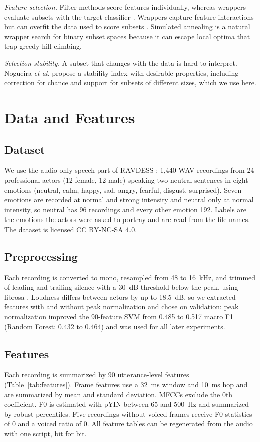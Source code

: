 \documentclass[conference]{IEEEtran}
\begin{document}
\emph{Feature selection.} Filter methods score features individually, whereas wrappers evaluate
subsets with the target classifier \cite{guyon2003featsel}. Wrappers capture feature
interactions but can overfit the data used to score subsets \cite{kohavi1997wrappers}. Simulated
annealing \cite{kirkpatrick1983sa} is a natural wrapper search for binary subset spaces because
it can escape local optima that trap greedy hill climbing.

\emph{Selection stability.} A subset that changes with the data is hard to interpret. Nogueira
\emph{et al.} \cite{nogueira2018stability} propose a stability index with desirable properties,
including correction for chance and support for subsets of different sizes, which we use here.

\section{Data and Features}

\subsection{Dataset}
We use the audio-only speech part of RAVDESS \cite{livingstone2018ravdess}: 1{,}440 WAV
recordings from 24 professional actors (12 female, 12 male) speaking two neutral sentences in
eight emotions (neutral, calm, happy, sad, angry, fearful, disgust, surprised). Seven emotions are
recorded at normal and strong intensity and neutral only at normal intensity, so neutral has 96
recordings and every other emotion 192. Labels are the emotions the actors were asked to portray
and are read from the file names. The dataset is licensed CC BY-NC-SA 4.0.

\subsection{Preprocessing}
Each recording is converted to mono, resampled from 48 to 16~kHz, and trimmed of leading and
trailing silence with a 30~dB threshold below the peak, using librosa \cite{mcfee2015librosa}.
Loudness differs between actors by up to 18.5~dB, so we extracted features with and without peak
normalization and chose on validation: peak normalization improved the 90-feature SVM from 0.485
to 0.517 macro F1 (Random Forest: 0.432 to 0.464) and was used for all later experiments.

\subsection{Features}
Each recording is summarized by 90 utterance-level features (Table~\ref{tab:features}). Frame
features use a 32~ms window and 10~ms hop and are summarized by mean and standard deviation. MFCCs
\cite{davis1980mfcc} exclude the 0th coefficient. F0 is estimated with pYIN \cite{mauch2014pyin}
between 65 and 500~Hz and summarized by robust percentiles. Five recordings without voiced frames
receive F0 statistics of 0 and a voiced ratio of 0. All feature tables can be regenerated from the
audio with one script, bit for bit.
\end{document}
